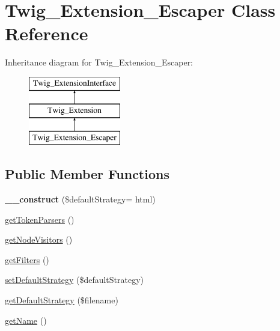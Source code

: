 \hypertarget{class_twig___extension___escaper}{}\section{Twig\+\_\+\+Extension\+\_\+\+Escaper Class Reference}
\label{class_twig___extension___escaper}
Inheritance diagram for Twig\+\_\+\+Extension\+\_\+\+Escaper\+:\begin{figure}[H]
\begin{center}
\leavevmode
\includegraphics[height=3.000000cm]{class_twig___extension___escaper}
\end{center}
\end{figure}
\subsection*{Public Member Functions}
\begin{DoxyCompactItemize}
\item 
\hypertarget{class_twig___extension___escaper_ab55f082b420ecc326fca4ede1a471709}{}{\bfseries \+\_\+\+\_\+construct} (\$default\+Strategy= \textquotesingle{}html\textquotesingle{})\label{class_twig___extension___escaper_ab55f082b420ecc326fca4ede1a471709}

\item 
\hyperlink{class_twig___extension___escaper_a8fd35903c3d01c0f0078f59d142eb063}{get\+Token\+Parsers} ()
\item 
\hyperlink{class_twig___extension___escaper_aec02093179d390d22ae4083f23a1d74a}{get\+Node\+Visitors} ()
\item 
\hyperlink{class_twig___extension___escaper_a428d91319fc73d3038784cf5436936b6}{get\+Filters} ()
\item 
\hyperlink{class_twig___extension___escaper_a567473dcbaced1e4ffc5b3b0c5e568f3}{set\+Default\+Strategy} (\$default\+Strategy)
\item 
\hyperlink{class_twig___extension___escaper_a8c9abab9ba2519ae254eb896eb61073b}{get\+Default\+Strategy} (\$filename)
\item 
\hyperlink{class_twig___extension___escaper_a3d0963e68bb313b163a73f2803c64600}{get\+Name} ()
\end{DoxyCompactItemize}
